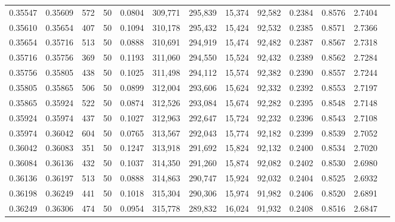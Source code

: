 \begin{tabular}{rrrrrrrrrrrrr}
0.35547 & 0.35609 &   572 &  50 &                                     0.0804 & 309,771 & 295,839 &  15,374 &  92,582 & 0.2384 & 0.8576 & 2.7404 \\
0.35610 & 0.35654 &   407 &  50 &                                     0.1094 & 310,178 & 295,432 &  15,424 &  92,532 & 0.2385 & 0.8571 & 2.7366 \\
0.35654 & 0.35716 &   513 &  50 &                                     0.0888 & 310,691 & 294,919 &  15,474 &  92,482 & 0.2387 & 0.8567 & 2.7318 \\
0.35716 & 0.35756 &   369 &  50 &                                     0.1193 & 311,060 & 294,550 &  15,524 &  92,432 & 0.2389 & 0.8562 & 2.7284 \\
0.35756 & 0.35805 &   438 &  50 &                                     0.1025 & 311,498 & 294,112 &  15,574 &  92,382 & 0.2390 & 0.8557 & 2.7244 \\
0.35805 & 0.35865 &   506 &  50 &                                     0.0899 & 312,004 & 293,606 &  15,624 &  92,332 & 0.2392 & 0.8553 & 2.7197 \\
0.35865 & 0.35924 &   522 &  50 &                                     0.0874 & 312,526 & 293,084 &  15,674 &  92,282 & 0.2395 & 0.8548 & 2.7148 \\
0.35924 & 0.35974 &   437 &  50 &                                     0.1027 & 312,963 & 292,647 &  15,724 &  92,232 & 0.2396 & 0.8543 & 2.7108 \\
0.35974 & 0.36042 &   604 &  50 &                                     0.0765 & 313,567 & 292,043 &  15,774 &  92,182 & 0.2399 & 0.8539 & 2.7052 \\
0.36042 & 0.36083 &   351 &  50 &                                     0.1247 & 313,918 & 291,692 &  15,824 &  92,132 & 0.2400 & 0.8534 & 2.7020 \\
0.36084 & 0.36136 &   432 &  50 &                                     0.1037 & 314,350 & 291,260 &  15,874 &  92,082 & 0.2402 & 0.8530 & 2.6980 \\
0.36136 & 0.36197 &   513 &  50 &                                     0.0888 & 314,863 & 290,747 &  15,924 &  92,032 & 0.2404 & 0.8525 & 2.6932 \\
0.36198 & 0.36249 &   441 &  50 &                                     0.1018 & 315,304 & 290,306 &  15,974 &  91,982 & 0.2406 & 0.8520 & 2.6891 \\
0.36249 & 0.36306 &   474 &  50 &                                     0.0954 & 315,778 & 289,832 &  16,024 &  91,932 & 0.2408 & 0.8516 & 2.6847 \\

\end{tabular}

